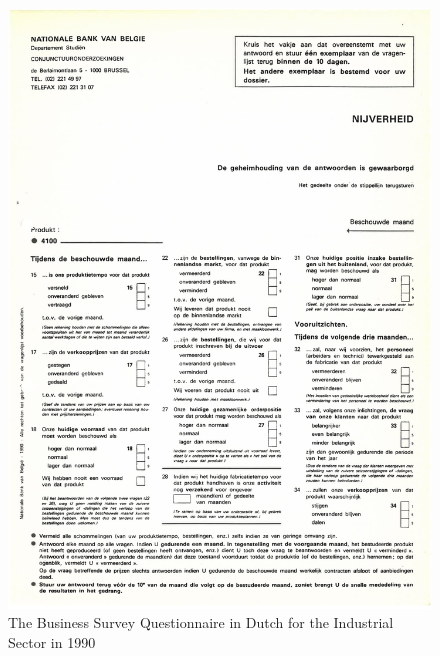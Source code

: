 \documentclass[12pt,a4paper,oneside]{book}
\begin{document}
\begin{figure}[H]
    \centering
    \includegraphics[scale=0.75]{Images/4100N_v1990.pdf}
    \caption{The Business Survey Questionnaire in Dutch for the Industrial Sector in 1990}
    \label{Questionnaire1990}
\end{figure}
\end{document}

